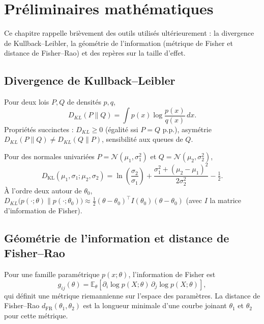 \chapter{Préliminaires mathématiques}
\label{chap:math}

Ce chapitre rappelle brièvement des outils utilisés ultérieurement : la divergence de Kullback--Leibler, la géométrie de l'information (métrique de Fisher et distance de Fisher--Rao) et des repères sur la taille d'effet.

\section{Divergence de Kullback--Leibler}
Pour deux lois $P,Q$ de densités $p,q$, \citep{ay2017information}
\begin{equation}
	D_{KL}(P\|Q)=\int p(x)\log\frac{p(x)}{q(x)}\,dx.
\end{equation}
Propriétés succinctes : $D_{KL}\ge0$ (égalité ssi $P=Q$ p.p.), asymétrie $D_{KL}(P\|Q)\neq D_{KL}(Q\|P)$, sensibilité aux queues de $Q$.

Pour des normales univariées $P=\mathcal{N}(\mu_1,\sigma_1^2)$ et $Q=\mathcal{N}(\mu_2,\sigma_2^2)$, \citep{belov2011distributions}
\begin{equation}
	D_{\mathrm{KL}}(\mu_{1},\sigma_{1};\mu_{2},\sigma_{2})
	= \ln\left(\frac{\sigma_{2}}{\sigma_{1}}\right)
	+ \frac{\sigma_{1}^{2}+(\mu_{2}-\mu_{1})^{2}}{2\sigma_{2}^{2}} - \tfrac{1}{2}.
	\label{eq:kl_normal}
\end{equation}
À l'ordre deux autour de $\theta_0$, $D_{KL}\big(p(\cdot;\theta)\|p(\cdot;\theta_0)\big)\approx\tfrac{1}{2}(\theta-\theta_0)^\top I(\theta_0)(\theta-\theta_0)$ (avec $I$ la matrice d'information de Fisher).

\section{Géométrie de l'information et distance de Fisher--Rao}
Pour une famille paramétrique $p(x;\theta)$, l'information de Fisher est \citep{ay2017information}
\begin{equation}
	g_{ij}(\theta)=\mathbb{E}_{\theta}\!\left[\partial_{i}\log p(X;\theta)\,\partial_{j}\log p(X;\theta)\right],
\end{equation}
qui définit une métrique riemannienne sur l'espace des paramètres. La distance de Fisher--Rao $d_{\mathrm{FR}}(\theta_1,\theta_2)$ est la longueur minimale d'une courbe joinant $\theta_1$ et $\theta_2$ pour cette métrique.


